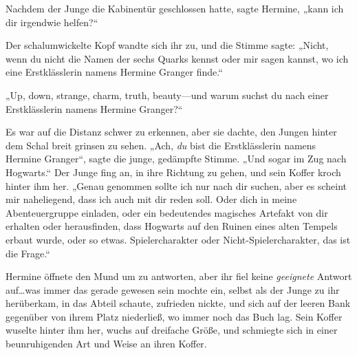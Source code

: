 Nachdem der Junge die Kabinentür geschlossen hatte, sagte Hermine, „kann ich dir irgendwie helfen?“

Der schalumwickelte Kopf wandte sich ihr zu, und die Stimme sagte: „Nicht, wenn du nicht die Namen der sechs Quarks kennst oder mir sagen kannst, wo ich eine Erstklässlerin namens Hermine Granger finde.“

„Up, down, strange, charm, truth, beauty—und warum suchst du nach einer Erstklässlerin namens Hermine Granger?“

Es war auf die Distanz schwer zu erkennen, aber sie dachte, den Jungen hinter dem Schal breit grinsen zu sehen. „Ach, \emph{du} bist die Erstklässlerin namens Hermine Granger“, sagte die junge, gedämpfte Stimme. „Und sogar im Zug nach Hogwarts.“ Der Junge fing an, in ihre Richtung zu gehen, und sein Koffer kroch hinter ihm her. „Genau genommen sollte ich nur nach dir suchen, aber es scheint mir naheliegend, dass ich auch mit dir reden soll. Oder dich in meine Abenteuergruppe einladen, oder ein bedeutendes magisches Artefakt von dir erhalten oder herausfinden, dass Hogwarts auf den Ruinen eines alten Tempels erbaut wurde, oder so etwas. Spielercharakter oder Nicht-Spielercharakter, das ist die Frage.“

Hermine öffnete den Mund um zu antworten, aber ihr fiel keine \emph{geeignete} Antwort auf…was immer das gerade gewesen sein mochte ein, selbst als der Junge zu ihr herüberkam, in das Abteil schaute, zufrieden nickte, und sich auf der leeren Bank gegenüber von ihrem Platz niederließ, wo immer noch das Buch lag. Sein Koffer wuselte hinter ihm her, wuchs auf dreifache Größe, und schmiegte sich in einer beunruhigenden Art und Weise an ihren Koffer.

